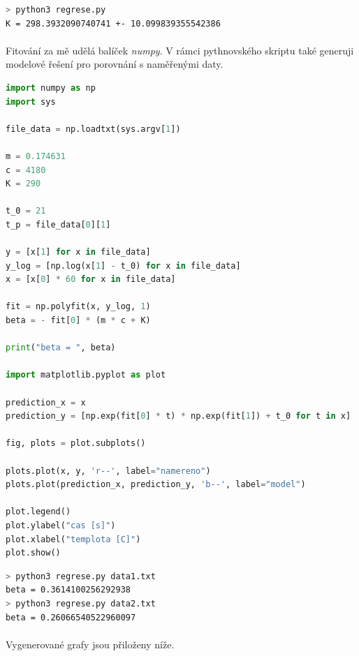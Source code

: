 \documentclass[a4paper,11pt]{article}
\begin{document}
    \begin{lstlisting}[language=Bash]
> python3 regrese.py 
K = 298.3932090740741 +- 10.099839355542386 \end{lstlisting}


    \paragraph{} Fitování za mě udělá balíček \textit{numpy}. V rámci
    pythnovského skriptu také generuji modelové řešení pro porovnání
    s naměřenými daty.

    \begin{lstlisting}[language=Python]
import numpy as np
import sys

file_data = np.loadtxt(sys.argv[1])

m = 0.174631
c = 4180
K = 290

t_0 = 21
t_p = file_data[0][1]

y = [x[1] for x in file_data]
y_log = [np.log(x[1] - t_0) for x in file_data]
x = [x[0] * 60 for x in file_data]

fit = np.polyfit(x, y_log, 1)
beta = - fit[0] * (m * c + K)

print("beta = ", beta)

import matplotlib.pyplot as plot

prediction_x = x
prediction_y = [np.exp(fit[0] * t) * np.exp(fit[1]) + t_0 for t in x]

fig, plots = plot.subplots()

plots.plot(x, y, 'r--', label="namereno")
plots.plot(prediction_x, prediction_y, 'b--', label="model")

plot.legend()
plot.ylabel("cas [s]")
plot.xlabel("templota [C]")
plot.show()\end{lstlisting} 

    \begin{lstlisting}[language=Bash]
> python3 regrese.py data1.txt
beta = 0.3614100256292938
> python3 regrese.py data2.txt
beta = 0.26066540522960097
\end{lstlisting}

    \paragraph{} Vygenerované grafy jsou přiloženy níže.
\end{document}
